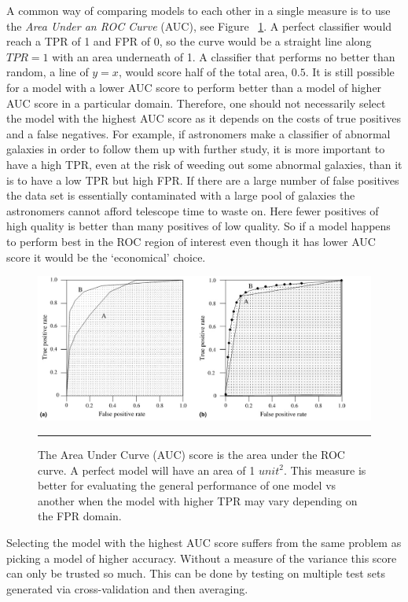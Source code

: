 A common way of comparing models to each other in a single measure is to use the \textit{Area Under an ROC Curve} (AUC), see Figure ~\ref{fig:AUC_score}.
A perfect classifier would reach a TPR of 1 and FPR of 0, so the curve would be a straight line along $TPR = 1$ with an area underneath of 1.
A classifier that performs no better than random, a line of $y = x$, would score half of the total area, $0.5$.
It is still possible for a model with a lower AUC score to perform better than a model of higher AUC score in a particular domain.
Therefore, one should not necessarily select the model with the highest AUC score as it depends on the costs of true positives and a false negatives.
For example, if astronomers make a classifier of abnormal galaxies in order to follow them up with further study, it is more important to have a high TPR, even at the risk of weeding out some abnormal galaxies, than it is to have a low TPR but high FPR.
If there are a large number of false positives the data set is essentially contaminated with a large pool of galaxies the astronomers cannot afford telescope time to waste on.
Here fewer positives of high quality is better than many positives of low quality.
So if a model happens to perform best in the ROC region of interest even though it has lower AUC score it would be the `economical' choice.
\begin{figure}[htbp]
	\centering
		\includegraphics[width = 1.0\textwidth]{./Figures/AUC_measure_introduction_to_roc_analysis_2.jpg}
		\rule{35em}{0.5pt}
	\caption[The AUC Score]{The Area Under Curve (AUC) score is the area under the ROC curve. A perfect model will have an area of 1 $unit^2$. This measure is better for evaluating the general performance of one model vs another when the model with higher TPR may vary depending on the FPR domain.}
	\label{fig:AUC_score}
\end{figure}

Selecting the model with the highest AUC score suffers from the same problem as picking a model of higher accuracy.
Without a measure of the variance this score can only be trusted so much.
This can be done by testing on multiple test sets generated via cross-validation and then averaging.

